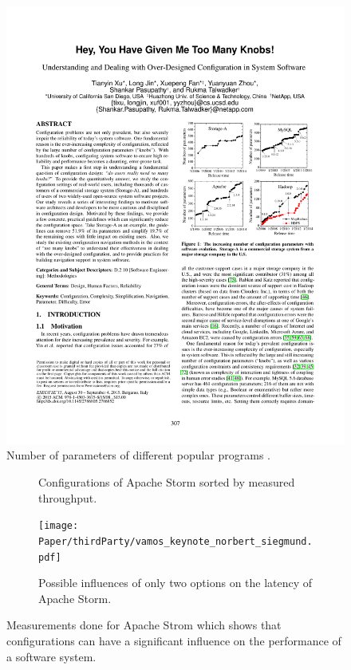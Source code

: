 \begin{figure}[t]
	\centering
	\includegraphics[clip,trim= 11cm 13cm 2cm 7cm]{Paper/thirdParty/HeyYouHaveGivenMeTooManyKnobs.pdf}
	\caption{Number of parameters of different popular programs \cite{YouveGivenMeTooManyKnobs}.}
	\label{fig:paramters}
\end{figure}
\begin{figure}[t]
	\begin{subfigure}{.45\linewidth}
		\centering
		\caption{Configurations of Apache Storm sorted by measured throughput.}
		\label{fig:ApacheStorma}
	\end{subfigure}\hspace{.1\linewidth}
	\begin{subfigure}{.45\linewidth}
		\centering
		\texttt{[image: Paper/thirdParty/vamos\_keynote\_norbert\_siegmund.pdf]}
		\caption{Possible influences of only two options on the latency of Apache Storm. }
		\label{fig:ApacheStormb}
	\end{subfigure}
	\caption{Measurements done for Apache Strom which shows that configurations can have a significant influence on the performance of a software system.}
	\label{fig:ApacheStorm}
\end{figure}

